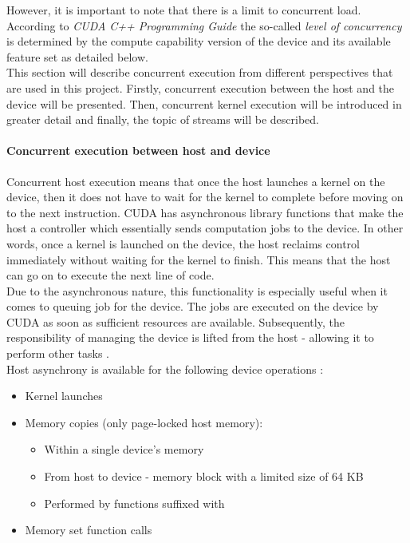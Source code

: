 However, it is important to note that there is a limit to concurrent load. According to \emph{CUDA C++ Programming Guide} \cite{NVIDIAMay2022} the so-called \textit{level of concurrency} is determined by the compute capability version of the device and its available feature set as detailed below. \\
This section will describe concurrent execution from different perspectives that are used in this project. Firstly, concurrent execution between the host and the device will be presented. Then, concurrent kernel execution will be introduced in greater detail and finally, the topic of streams will be described.
 
\paragraph{Concurrent execution between host and device}
Concurrent host execution means that once the host launches a kernel on the device, then it does not have to wait for the kernel to complete before moving on to the next instruction. CUDA has asynchronous library functions that make the host a controller which essentially sends computation jobs to the device. In other words, once a kernel is launched on the device, the host reclaims control immediately without waiting for the kernel to finish. This means that the host can go on to execute the next line of code. \\
Due to the asynchronous nature, this functionality is especially useful when it comes to queuing job for the device. The jobs are executed on the device by CUDA as soon as sufficient resources are available. Subsequently, the responsibility of managing the device is lifted from the host - allowing it to perform other tasks \cite{NVIDIAMay2022}. \\
Host asynchrony is available for the following device operations \cite{NVIDIAMay2022}:

\begin{itemize}
	\item Kernel launches
	\item Memory copies (only page-locked host memory):
	\begin{itemize}
		\item Within a single device's memory
		\item From host to device - memory block with a limited size of 64 KB
		\item Performed by functions suffixed with 
	\end{itemize}
	\item Memory set function calls
\end{itemize}

